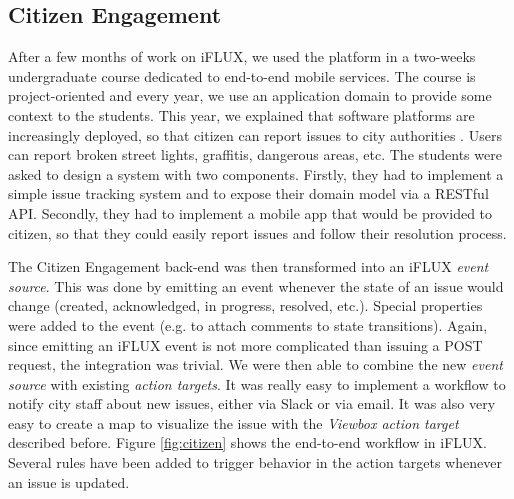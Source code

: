 


\subsection{Citizen Engagement}

After a few months of work on iFLUX, we used the platform in a two-weeks undergraduate course dedicated to end-to-end mobile services. The course is project-oriented and every year, we use an application domain to provide some context to the students. This year, we explained that software platforms are increasingly deployed, so that citizen can report issues to city authorities \cite{patel2015guide,offenhuber2014infrastructure}. Users can report broken street lights, graffitis, dangerous areas, etc. The students were asked to design a system with two components. Firstly, they had to implement a simple issue tracking system and to expose their domain model via a RESTful API. Secondly, they had to implement a mobile app that would be provided to citizen, so that they could easily report issues and follow their resolution process.

The Citizen Engagement back-end was then transformed into an iFLUX \emph{event source}. This was done by emitting an event whenever the state of an issue would change (created, acknowledged, in progress, resolved, etc.). Special properties were added to the event (e.g. to attach comments to state transitions). Again, since emitting an iFLUX event is not more complicated than issuing a POST request, the integration was trivial. 
We were then able to combine the new \emph{event source} with existing \emph{action targets}. It was really easy to implement a workflow to notify city staff about new issues, either via Slack or via email. It was also very easy to create a map to visualize the issue with the \emph{Viewbox action target} described before. Figure \ref{fig:citizen} shows the end-to-end workflow in iFLUX. Several rules have been added to trigger behavior in the action targets whenever an issue is updated.




